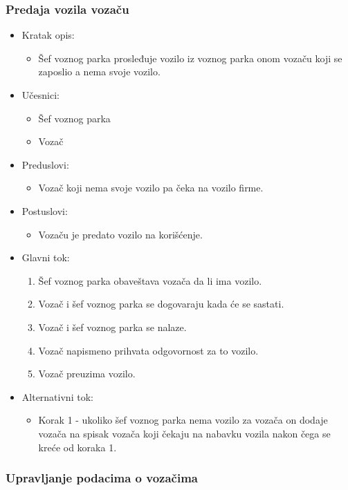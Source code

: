 \subsubsection{\bfseries Predaja vozila vozaču}

\begin{itemize}
	\item Kratak opis:
		\begin{itemize}
			\item Šef voznog parka prosleđuje vozilo iz voznog parka onom vozaču koji se zaposlio a nema svoje vozilo.
		\end{itemize}
	\item Učesnici:
		\begin{itemize}
		    \item Šef voznog parka
			\item Vozač
		\end{itemize}
	\item Preduslovi:
		\begin{itemize}
		    \item Vozač koji nema svoje vozilo pa čeka na vozilo firme.
		\end{itemize}
	\item Postuslovi:
		\begin{itemize}
			\item Vozaču je predato vozilo na korišćenje.
	\end{itemize}
	\item Glavni tok:
		\begin{enumerate}
		    \item Šef voznog parka obaveštava vozača da li ima vozilo.
		    \item Vozač i šef voznog parka se dogovaraju kada će se sastati.
		    \item Vozač i šef voznog parka se nalaze.
			\item Vozač napismeno prihvata odgovornost za to vozilo.
			\item Vozač preuzima vozilo.
		\end{enumerate}
	\item Alternativni tok:
		\begin{itemize}
		    \item Korak 1 - ukoliko šef voznog parka nema vozilo za vozača on dodaje vozača na spisak vozača koji čekaju na nabavku vozila nakon čega se kreće od koraka 1.
		\end{itemize}
\end{itemize}


\subsubsection{\bfseries Upravljanje podacima o vozačima}

